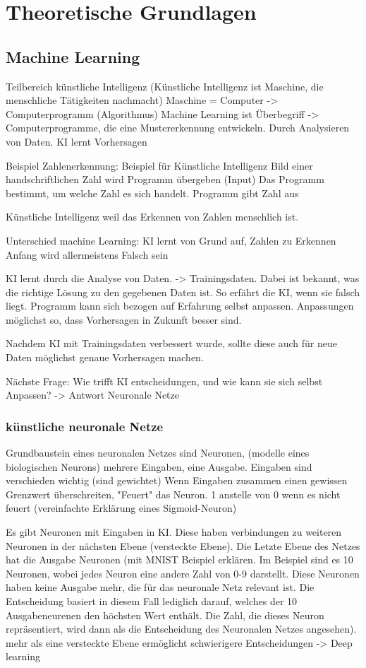 \chapter{Theoretische Grundlagen}

\section{Machine Learning}
\label{chap:t_ml}
Teilbereich künstliche Intelligenz (Künstliche Intelligenz ist Maschine, die
menschliche Tätigkeiten nachmacht) Maschine = Computer -> Computerprogramm
(Algorithmus) Machine Learning ist Überbegriff -> Computerprogramme, die eine
Mustererkennung entwickeln. Durch Analysieren von Daten. KI lernt Vorhersagen

Beispiel Zahlenerkennung: Beispiel für Künstliche Intelligenz Bild einer
handschriftlichen Zahl wird Programm übergeben (Input) Das Programm bestimmt, um
welche Zahl es sich handelt. Programm gibt Zahl aus

Künstliche Intelligenz weil das Erkennen von Zahlen menschlich ist.

Unterschied machine Learning: KI lernt von Grund auf, Zahlen zu Erkennen Anfang
wird allermeistens Falsch sein

KI lernt durch die Analyse von Daten. -> Trainingsdaten. Dabei ist bekannt, was
die richtige Lösung zu den gegebenen Daten ist. So erfährt die KI, wenn sie
falsch liegt. Programm kann sich bezogen auf Erfahrung selbst anpassen.
Anpassungen möglichst so, dass Vorhersagen in Zukunft besser sind.

Nachdem KI mit Trainingsdaten verbessert wurde, sollte diese auch für neue Daten
möglichst genaue Vorhersagen machen.

Nächste Frage: Wie trifft KI entscheidungen, und wie kann sie sich selbst
Anpassen? -> Antwort Neuronale Netze


\subsection*{künstliche neuronale Netze}

Grundbaustein eines neuronalen Netzes sind Neuronen, (modelle eines biologischen
Neurons) mehrere Eingaben, eine Ausgabe. Eingaben sind verschieden wichtig (sind
gewichtet) Wenn Eingaben zusammen einen gewissen Grenzwert überschreiten,
"Feuert" das Neuron. 1 anstelle von 0 wenn es nicht feuert (vereinfachte
Erklärung eines Sigmoid-Neuron)

Es gibt Neuronen mit Eingaben in KI. Diese haben verbindungen zu weiteren
Neuronen in der nächsten Ebene (versteckte Ebene). Die Letzte Ebene des Netzes
hat die Ausgabe Neuronen (mit MNIST Beispiel erklären. Im Beispiel sind es 10
Neuronen, wobei jedes Neuron eine andere Zahl von 0-9 darstellt. Diese Neuronen
haben keine Ausgabe mehr, die für das neuronale Netz relevant ist. Die
Entscheidung basiert in diesem Fall lediglich darauf, welches der 10
Ausgabeneurenen den höchsten Wert enthält. Die Zahl, die dieses Neuron
repräsentiert, wird dann als die Entscheidung des Neuronalen Netzes angesehen).
mehr als eine versteckte Ebene ermöglicht schwierigere Entscheidungen -> Deep
learning


